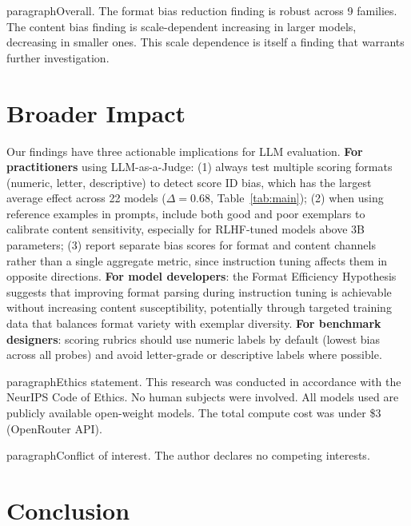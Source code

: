 \documentclass[11pt,twocolumn]{article}
\begin{document}
paragraph{Overall.} The format bias reduction finding is robust across 9 families. The content bias finding is scale-dependent  increasing in larger models, decreasing in smaller ones. This scale dependence is itself a finding that warrants further investigation.

\section{Broader Impact}

Our findings have three actionable implications for LLM evaluation. \textbf{For practitioners} using LLM-as-a-Judge: (1) always test multiple scoring formats (numeric, letter, descriptive) to detect score ID bias, which has the largest average effect across 22 models ($\Delta=0.68$, Table~\ref{tab:main}); (2) when using reference examples in prompts, include both good and poor exemplars to calibrate content sensitivity, especially for RLHF-tuned models above 3B parameters; (3) report separate bias scores for format and content channels rather than a single aggregate metric, since instruction tuning affects them in opposite directions. \textbf{For model developers}: the Format Efficiency Hypothesis suggests that improving format parsing during instruction tuning is achievable without increasing content susceptibility, potentially through targeted training data that balances format variety with exemplar diversity. \textbf{For benchmark designers}: scoring rubrics should use numeric labels by default (lowest bias across all probes) and avoid letter-grade or descriptive labels where possible.

paragraph{Ethics statement.}
This research was conducted in accordance with the NeurIPS Code of Ethics. No human subjects were involved. All models used are publicly available open-weight models. The total compute cost was under \$3 (OpenRouter API).

paragraph{Conflict of interest.}
The author declares no competing interests.

\section{Conclusion}
\end{document}
